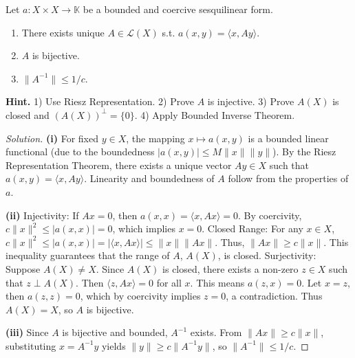\documentclass{article}
\begin{document}
	\begin{problem}
		Let $a: X \times X \rightarrow \mathbb{K}$ be a bounded and coercive sesquilinear form.
		\begin{enumerate}
		    \item[(i)] There exists unique $A \in \mathcal{L}(X)$ s.t. $a(x,y) = \langle x, Ay \rangle$.
		    \item[(ii)] $A$ is bijective.
		    \item[(iii)] $\|A^{-1}\| \le 1/c$.
		\end{enumerate}
		\textbf{Hint.} 1) Use Riesz Representation. 2) Prove $A$ is injective. 3) Prove $A(X)$ is closed and $(A(X))^\perp = \{0\}$. 4) Apply Bounded Inverse Theorem.
	\end{problem}
    \begin{proof}[Solution]
        \textbf{(i)} For fixed $y \in X$, the mapping $x \mapsto a(x, y)$ is a bounded linear functional (due to the boundedness $|a(x,y)| \le M\|x\|\|y\|$). By the Riesz Representation Theorem, there exists a unique vector $Ay \in X$ such that $a(x,y) = \langle x, Ay \rangle$. Linearity and boundedness of $A$ follow from the properties of $a$.
        
        \textbf{(ii)} Injectivity: If $Ax = 0$, then $a(x,x) = \langle x, Ax \rangle = 0$. By coercivity, $c\|x\|^2 \le |a(x,x)| = 0$, which implies $x = 0$. 
        Closed Range: For any $x \in X$, $c\|x\|^2 \le |a(x,x)| = |\langle x, Ax \rangle| \le \|x\| \|Ax\|$. Thus, $\|Ax\| \ge c\|x\|$. This inequality guarantees that the range of $A$, $A(X)$, is closed.
        Surjectivity: Suppose $A(X) \neq X$. Since $A(X)$ is closed, there exists a non-zero $z \in X$ such that $z \perp A(X)$. Then $\langle z, Ax \rangle = 0$ for all $x$. This means $a(z, x) = 0$. Let $x = z$, then $a(z, z) = 0$, which by coercivity implies $z = 0$, a contradiction. Thus $A(X) = X$, so $A$ is bijective.
        
        \textbf{(iii)} Since $A$ is bijective and bounded, $A^{-1}$ exists. From $\|Ax\| \ge c\|x\|$, substituting $x = A^{-1}y$ yields $\|y\| \ge c\|A^{-1}y\|$, so $\|A^{-1}\| \le 1/c$.
    \end{proof}
\end{document}

